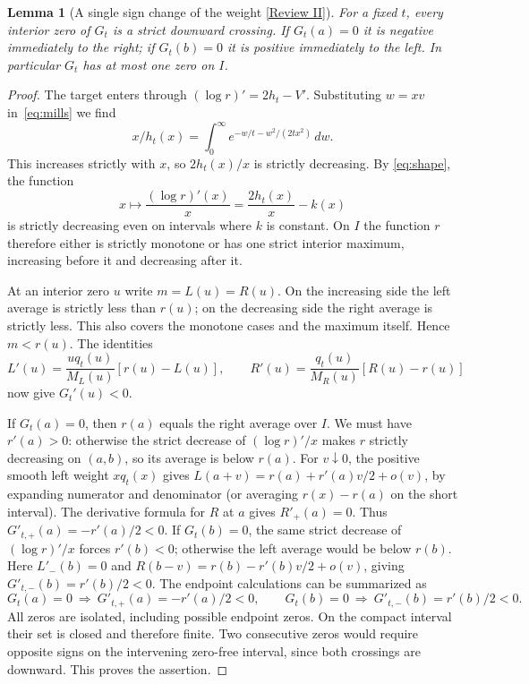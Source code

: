 \documentclass[11pt]{article}
\newcommand{\rmark}[1]{\hyperlink{reviewguide}{\textcolor{reviewblue}{\normalfont\small [Review #1]}}}
\newtheorem{lemma}[theorem]{Lemma}
\begin{document}
\begin{lemma}[A single sign change of the weight \rmark{II}]\label{lem:weight}
For a fixed $t$, every interior zero of $G_t$ is a strict downward crossing.
If $G_t(a)=0$ it is negative immediately to the right; if $G_t(b)=0$ it is
positive immediately to the left. In particular $G_t$ has at most one zero
on $I$.
\end{lemma}
\begin{proof}
The target enters through $(\log r)'=2h_t-V'$. Substituting $w=xv$
in~\eqref{eq:mills} we find
\[
 x/h_t(x)=\int_0^\infty e^{-w/t-w^2/(2tx^2)}\,dw .
\]
This increases strictly with $x$, so $2h_t(x)/x$ is strictly decreasing.
By \eqref{eq:shape}, the function
\begin{equation}\label{eq:keyshape}
 x\longmapsto\frac{(\log r)'(x)}{x}=\frac{2h_t(x)}{x}-k(x)
\end{equation}
is strictly decreasing even on intervals where $k$ is constant.
On $I$ the function $r$ therefore either is strictly monotone or has one
strict interior maximum, increasing before it and decreasing after it.

At an interior zero $u$ write $m=L(u)=R(u)$. On the increasing side the
left average is strictly less than $r(u)$; on the decreasing side the
right average is strictly less. This also covers the monotone cases and the
maximum itself. Hence $m<r(u)$. The identities
\[
 L'(u)=\frac{u q_t(u)}{M_L(u)}[r(u)-L(u)],\qquad
 R'(u)=\frac{q_t(u)}{M_R(u)}[R(u)-r(u)]
\]
now give $G_t'(u)<0$.

If $G_t(a)=0$, then $r(a)$ equals the right average over $I$. We must
have $r'(a)>0$: otherwise the strict decrease of $(\log r)'/x$ makes $r$
strictly decreasing on $(a,b)$, so its average is below $r(a)$.
For $v\downarrow0$, the positive smooth left weight $xq_t(x)$ gives
$L(a+v)=r(a)+r'(a)v/2+o(v)$, by expanding numerator and denominator
(or averaging $r(x)-r(a)$ on the short interval). The derivative formula
for $R$ at $a$ gives $R'_+(a)=0$. Thus $G'_{t,+}(a)=-r'(a)/2<0$.
If $G_t(b)=0$, the same strict decrease of $(\log r)'/x$ forces $r'(b)<0$;
otherwise the left average would be below $r(b)$. Here $L'_-(b)=0$ and
$R(b-v)=r(b)-r'(b)v/2+o(v)$, giving $G'_{t,-}(b)=r'(b)/2<0$.
The endpoint calculations can be summarized as
\begin{equation}\label{eq:endpoints}
 G_t(a)=0\ \Longrightarrow\ G'_{t,+}(a)=-r'(a)/2<0,\qquad
 G_t(b)=0\ \Longrightarrow\ G'_{t,-}(b)=r'(b)/2<0 .
\end{equation}
All zeros are isolated, including possible endpoint zeros. On the compact
interval their set is closed and therefore finite. Two consecutive zeros
would require opposite signs on the intervening zero-free interval, since
both crossings are downward. This proves the assertion.
\end{proof}
\end{document}
